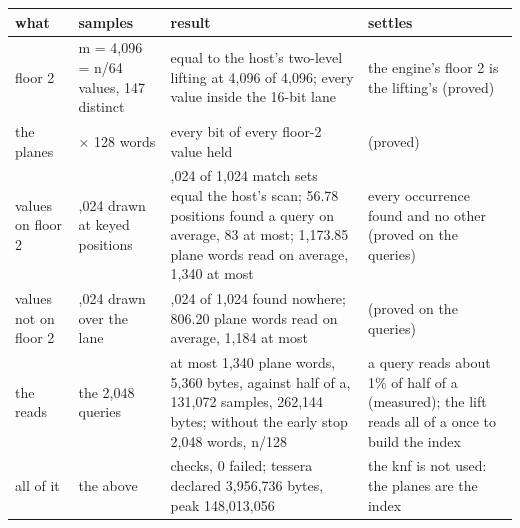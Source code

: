 {\footnotesize
\setlength{\tabcolsep}{6pt}
\begin{longtable}{>{\RaggedRight\arraybackslash}p{}>{\RaggedRight\arraybackslash}p{}>{\RaggedRight\arraybackslash}p{}>{\RaggedRight\arraybackslash}p{}}
\toprule
what & samples & result & settles \\
\midrule
\endhead
floor 2 & m = 4,096 = n/64 values, 147 distinct & equal to the host's two-level lifting at 4,096 of 4,096; every value inside the 16-bit lane & the engine's floor 2 is the lifting's (proved) \\
the planes & 16 × 128 words & every bit of every floor-2 value held & (proved) \\
values on floor 2 & 1,024 drawn at keyed positions & 1,024 of 1,024 match sets equal the host's scan; 56.78 positions found a query on average, 83 at most; 1,173.85 plane words read on average, 1,340 at most & every occurrence found and no other (proved on the queries) \\
values not on floor 2 & 1,024 drawn over the lane & 1,024 of 1,024 found nowhere; 806.20 plane words read on average, 1,184 at most & (proved on the queries) \\
the reads & the 2,048 queries & at most 1,340 plane words, 5,360 bytes, against half of a, 131,072 samples, 262,144 bytes; without the early stop 2,048 words, n/128 & a query reads about 1\% of half of a (measured); the lift reads all of a once to build the index \\
all of it & the above & 11 checks, 0 failed; tessera declared 3,956,736 bytes, peak 148,013,056 & the knf is not used: the planes are the index \\
\bottomrule
\end{longtable}
}
